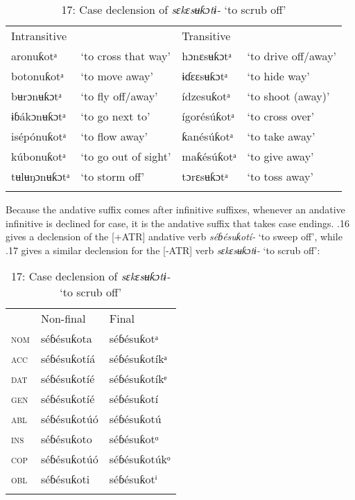 \begin{table}
\begin{table}
\begin{tabularx}{\textwidth}{XXXX}
Intransitive &  & \multicolumn{2}{X}{Transitive}\\
aronuƙotᵃ & ‘to cross that way’ & hɔnɛsʉƙɔtᵃ & ‘to drive off/away’\\
botonuƙotᵃ & ‘to move away’ & ɨɗɛɛsʉƙɔtᵃ & ‘to hide way’\\
bʉrɔnʉƙɔtᵃ & ‘to fly off/away’ & ídzesuƙotᵃ & ‘to shoot (away)’\\
ɨɓákɔnʉƙɔtᵃ & ‘to go next to’ & ígorésúƙotᵃ & ‘to cross over’\\
isépónuƙotᵃ & ‘to flow away’ & ƙanésúƙotᵃ & ‘to take away’\\
kúbonuƙotᵃ & ‘to go out of sight’ & maƙésúƙotᵃ & ‘to give away’\\
tʉlʉŋɔnʉƙɔtᵃ & ‘to storm off’ & tɔrɛsʉƙɔtᵃ & ‘to toss away’\\
\lspbottomrule
\end{tabularx}
\end{table}
Because the andative suffix comes after infinitive suffixes, whenever an andative infinitive is declined for case, it is the andative suffix that takes case endings. .16 gives a declension of the [+ATR] andative verb \textit{séɓésuƙotí- }‘to sweep off’, while .17 gives a similar declension for the [-ATR] verb \textit{sɛkɛsʉƙɔtɨ- }‘to scrub off’:


\begin{table}
\caption{16: Case declension of \textit{séɓésuƙotí- }‘to sweep off’}
\label{tab:8}


\begin{tabularx}{\textwidth}{XXX} & Non-final & Final\\
\lsptoprule
\textsc{nom} & séɓésuƙota & séɓésuƙotᵃ\\
\textsc{acc} & séɓésuƙotíá & séɓésuƙotíkᵃ\\
\textsc{dat} & séɓésuƙotíé & séɓésuƙotíkᵉ\\
\textsc{gen} & séɓésuƙotíé & séɓésuƙotí\\
\textsc{abl} & séɓésuƙotúó & séɓésuƙotú\\
\textsc{ins} & séɓésuƙoto & séɓésuƙotᵒ\\
\textsc{cop} & séɓésuƙotúó & séɓésuƙotúkᵒ\\
\textsc{obl} & séɓésuƙoti & séɓésuƙotⁱ\\
\lspbottomrule
\end{tabularx}
\end{table}

\begin{table}
\caption{17: Case declension of \textit{sɛkɛsʉƙɔtɨ- }‘to scrub off’}
\label{tab:8}



\end{table}
\end{table}
